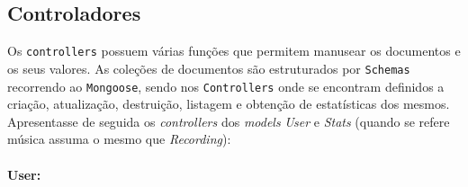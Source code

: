 \documentclass{article}
\begin{document}
\subsection{Controladores}

Os \texttt{controllers} possuem várias funções que permitem manusear os documentos e os seus valores. As coleções de documentos são estruturados por \texttt{Schemas} recorrendo ao \texttt{Mongoose}, sendo nos \texttt{Controllers} onde se encontram definidos a criação, atualização, destruição, listagem e obtenção de estatísticas dos mesmos. Apresentasse de seguida os \textit{controllers} dos \textit{models} \textit{User} e \textit{Stats} (quando se refere música assuma o mesmo que \textit{Recording}):

\paragraph{\textbf{User:}}
\end{document}
